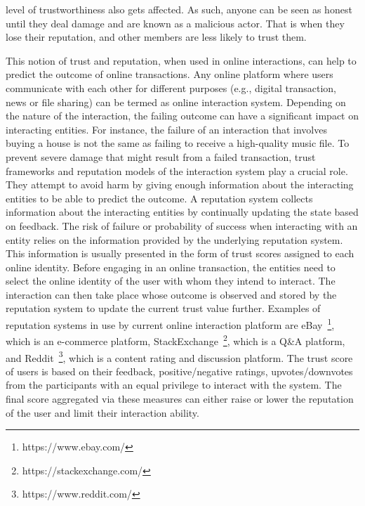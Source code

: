 level of trustworthiness also gets affected. As such, anyone can be seen as
honest until they deal damage and are known as a malicious actor. That is when
they lose their reputation, and other members are less likely to trust them. \par
This notion of trust and reputation, when used in online interactions, can help
to predict the outcome of online transactions. Any online platform where users
communicate with each other for different purposes (e.g., digital transaction,
news or file sharing) can be termed as online interaction system. Depending on
the nature of the interaction, the failing outcome can have a significant
impact on interacting entities. For instance, the failure of an interaction
that involves buying a house is not the same as failing to receive a
high-quality music file. To prevent severe damage that might result from a
failed transaction, trust frameworks and reputation models of the interaction
system play a crucial role. They attempt to avoid harm by giving enough
information about the interacting entities to be able to predict the outcome. A
reputation system collects information about the interacting entities by
continually updating the state based on feedback. The risk of failure or
probability of success when interacting with an entity relies on the
information provided by the underlying reputation system. This information is
usually presented in the form of trust scores assigned to each online identity.
Before engaging in an online transaction, the entities need to select the
online identity of the user with whom they intend to interact. The interaction
can then take place whose outcome is observed and stored by the reputation
system to update the current trust value further. Examples of reputation
systems in use by current online interaction platform are
eBay~\footnote{https://www.ebay.com/}, which is an e-commerce platform,
StackExchange~\footnote{https://stackexchange.com/}, which is a Q\&A platform,
and Reddit~\footnote{https://www.reddit.com/}, which is a content rating and
discussion platform. The trust score of users is based on their feedback,
positive/negative ratings, upvotes/downvotes from the participants with an
equal privilege to interact with the system. The final score aggregated via
these measures can either raise or lower the reputation of the user and limit
their interaction ability.  \par
